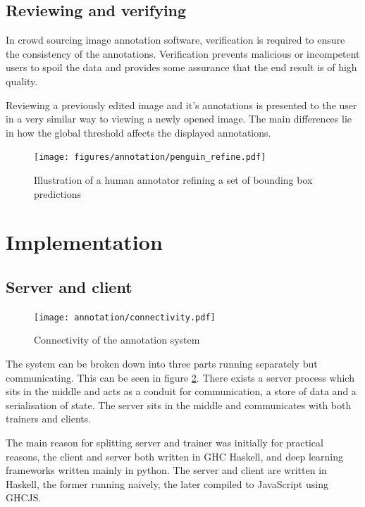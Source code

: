 \subsection {Reviewing and verifying}

In crowd sourcing image annotation software, verification is required to ensure the consistency of the annotations. Verification prevents malicious or incompetent users to spoil the data and provides some assurance that the end result is of high quality. 



Reviewing a previously edited image and it's annotations is presented to the user in a very similar way to viewing a newly opened image. The main differences lie in how the global threshold affects the displayed annotations. 





\begin{figure}[h]
  \centering
  \texttt{[image: figures/annotation/penguin\_refine.pdf]}
  \caption{Illustration of a human annotator refining a set of bounding box predictions }  
  \label{fig:penguin_refinement}
\end{figure}




\section {Implementation}

\subsection{Server and client}

\begin{figure}[h!]
  \centering
  \texttt{[image: annotation/connectivity.pdf]}
  \caption{Connectivity of the annotation system}  
  \label{fig:connectivity}
\end{figure}

The system can be broken down into three parts running separately but communicating. This can be seen in figure \ref{fig:connectivity}. There exists a server process which sits in the middle and acts as a conduit for communication, a store of data and a serialisation of state. The server sits in the middle and communicates with both trainers and clients.

The main reason for splitting server and trainer was initially for practical reasons, the client and server both written in \gls{GHC} Haskell, and deep learning frameworks written mainly in python. The server and client are written in Haskell, the former running naively, the later compiled to JavaScript using \gls{GHCJS}. 

